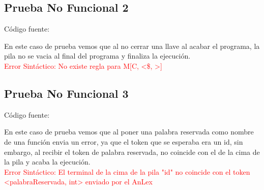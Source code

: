 \documentclass{article}[a4paper]
\newcommand\tab[1][1cm]{\hspace*{#1}}
\begin{document}
\begin{appendices}
\subsection{Prueba No Funcional 2}
Código fuente:

En este caso de prueba vemos que al no cerrar una llave al acabar el programa, la pila no se vacia al final del programa y finaliza la ejecución.\\
\tab \textcolor{red}{Error Sintáctico: No existe regla para M[C, <\$, >]}

\subsection{Prueba No Funcional 3}
Código fuente:

En este caso de prueba vemos que al poner una palabra reservada como nombre de una función envia un error, ya que el token que se esperaba era un id, sin embargo, al recibir el token de palabra reservada, no coincide con el de la cima de la pila y acaba la ejecución.\\
\tab \textcolor{red}{Error Sintáctico: El terminal de la cima de la pila "id" no coincide con el token <palabraReservada, int> enviado por el AnLex}

\end{appendices}
\end{document}
